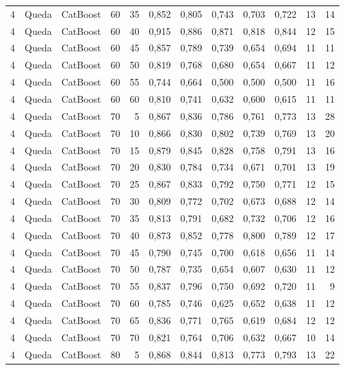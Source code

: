 \begin{longtable}{ccclrrrrrrrr}
4 & Queda & CatBoost & 60 & 35 & 0,852 & 0,805 & 0,743 & 0,703 & 0,722 & 13 & 14 \\
4 & Queda & CatBoost & 60 & 40 & 0,915 & 0,886 & 0,871 & 0,818 & 0,844 & 12 & 15 \\
4 & Queda & CatBoost & 60 & 45 & 0,857 & 0,789 & 0,739 & 0,654 & 0,694 & 11 & 11 \\
4 & Queda & CatBoost & 60 & 50 & 0,819 & 0,768 & 0,680 & 0,654 & 0,667 & 11 & 12 \\
4 & Queda & CatBoost & 60 & 55 & 0,744 & 0,664 & 0,500 & 0,500 & 0,500 & 11 & 16 \\
4 & Queda & CatBoost & 60 & 60 & 0,810 & 0,741 & 0,632 & 0,600 & 0,615 & 11 & 11 \\
4 & Queda & CatBoost & 70 & 5 & 0,867 & 0,836 & 0,786 & 0,761 & 0,773 & 13 & 28 \\
4 & Queda & CatBoost & 70 & 10 & 0,866 & 0,830 & 0,802 & 0,739 & 0,769 & 13 & 20 \\
4 & Queda & CatBoost & 70 & 15 & 0,879 & 0,845 & 0,828 & 0,758 & 0,791 & 13 & 16 \\
4 & Queda & CatBoost & 70 & 20 & 0,830 & 0,784 & 0,734 & 0,671 & 0,701 & 13 & 19 \\
4 & Queda & CatBoost & 70 & 25 & 0,867 & 0,833 & 0,792 & 0,750 & 0,771 & 12 & 15 \\
4 & Queda & CatBoost & 70 & 30 & 0,809 & 0,772 & 0,702 & 0,673 & 0,688 & 12 & 14 \\
4 & Queda & CatBoost & 70 & 35 & 0,813 & 0,791 & 0,682 & 0,732 & 0,706 & 12 & 16 \\
4 & Queda & CatBoost & 70 & 40 & 0,873 & 0,852 & 0,778 & 0,800 & 0,789 & 12 & 17 \\
4 & Queda & CatBoost & 70 & 45 & 0,790 & 0,745 & 0,700 & 0,618 & 0,656 & 11 & 14 \\
4 & Queda & CatBoost & 70 & 50 & 0,787 & 0,735 & 0,654 & 0,607 & 0,630 & 11 & 12 \\
4 & Queda & CatBoost & 70 & 55 & 0,837 & 0,796 & 0,750 & 0,692 & 0,720 & 11 & 9 \\
4 & Queda & CatBoost & 70 & 60 & 0,785 & 0,746 & 0,625 & 0,652 & 0,638 & 11 & 12 \\
4 & Queda & CatBoost & 70 & 65 & 0,836 & 0,771 & 0,765 & 0,619 & 0,684 & 12 & 12 \\
4 & Queda & CatBoost & 70 & 70 & 0,821 & 0,764 & 0,706 & 0,632 & 0,667 & 10 & 14 \\
4 & Queda & CatBoost & 80 & 5 & 0,868 & 0,844 & 0,813 & 0,773 & 0,793 & 13 & 22 \\

\end{longtable}
